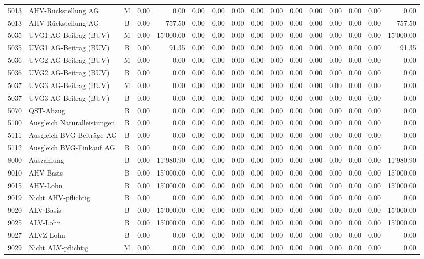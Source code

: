 \documentclass[8pt,a4paper]{extarticle}
\begin{document}
\begin{longtable}{@{\extracolsep{\fill}} l l c r r r r r r r r r r r r r}
5013&AHV-Rückstellung AG&M&0.00&0.00&0.00&0.00&0.00&0.00&0.00&0.00&0.00&0.00&0.00&0.00&0.00\\
5013&AHV-Rückstellung AG&B&0.00&757.50&0.00&0.00&0.00&0.00&0.00&0.00&0.00&0.00&0.00&0.00&757.50\\
5035&UVG1 AG-Beitrag (BUV)&M&0.00&15'000.00&0.00&0.00&0.00&0.00&0.00&0.00&0.00&0.00&0.00&0.00&15'000.00\\
5035&UVG1 AG-Beitrag (BUV)&B&0.00&91.35&0.00&0.00&0.00&0.00&0.00&0.00&0.00&0.00&0.00&0.00&91.35\\
5036&UVG2 AG-Beitrag (BUV)&M&0.00&0.00&0.00&0.00&0.00&0.00&0.00&0.00&0.00&0.00&0.00&0.00&0.00\\
5036&UVG2 AG-Beitrag (BUV)&B&0.00&0.00&0.00&0.00&0.00&0.00&0.00&0.00&0.00&0.00&0.00&0.00&0.00\\
5037&UVG3 AG-Beitrag (BUV)&M&0.00&0.00&0.00&0.00&0.00&0.00&0.00&0.00&0.00&0.00&0.00&0.00&0.00\\
5037&UVG3 AG-Beitrag (BUV)&B&0.00&0.00&0.00&0.00&0.00&0.00&0.00&0.00&0.00&0.00&0.00&0.00&0.00\\
5070&QST-Abzug&B&0.00&0.00&0.00&0.00&0.00&0.00&0.00&0.00&0.00&0.00&0.00&0.00&0.00\\
5100&Ausgleich Naturalleistungen&B&0.00&0.00&0.00&0.00&0.00&0.00&0.00&0.00&0.00&0.00&0.00&0.00&0.00\\
5111&Ausgleich BVG-Beiträge AG&B&0.00&0.00&0.00&0.00&0.00&0.00&0.00&0.00&0.00&0.00&0.00&0.00&0.00\\
5112&Ausgleich BVG-Einkauf AG&B&0.00&0.00&0.00&0.00&0.00&0.00&0.00&0.00&0.00&0.00&0.00&0.00&0.00\\
8000&Auszahlung&B&0.00&11'980.90&0.00&0.00&0.00&0.00&0.00&0.00&0.00&0.00&0.00&0.00&11'980.90\\
9010&AHV-Basis&B&0.00&15'000.00&0.00&0.00&0.00&0.00&0.00&0.00&0.00&0.00&0.00&0.00&15'000.00\\
9015&AHV-Lohn&B&0.00&15'000.00&0.00&0.00&0.00&0.00&0.00&0.00&0.00&0.00&0.00&0.00&15'000.00\\
9019&Nicht AHV-pflichtig&B&0.00&0.00&0.00&0.00&0.00&0.00&0.00&0.00&0.00&0.00&0.00&0.00&0.00\\
9020&ALV-Basis&B&0.00&15'000.00&0.00&0.00&0.00&0.00&0.00&0.00&0.00&0.00&0.00&0.00&15'000.00\\
9025&ALV-Lohn&B&0.00&15'000.00&0.00&0.00&0.00&0.00&0.00&0.00&0.00&0.00&0.00&0.00&15'000.00\\
9027&ALVZ-Lohn&B&0.00&0.00&0.00&0.00&0.00&0.00&0.00&0.00&0.00&0.00&0.00&0.00&0.00\\
9029&Nicht ALV-pflichtig&M&0.00&0.00&0.00&0.00&0.00&0.00&0.00&0.00&0.00&0.00&0.00&0.00&0.00\\

\end{longtable}
\end{document}

